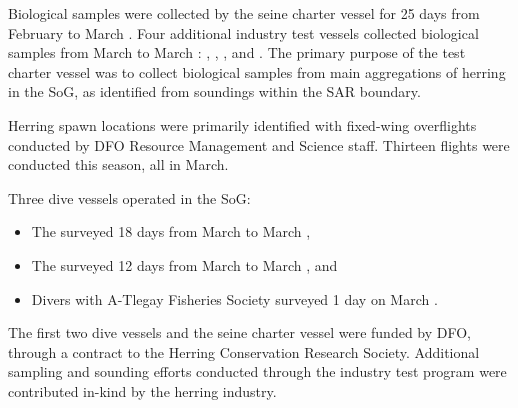 Biological samples were collected by the seine charter vessel
 for 25 days from February  to March .
Four additional industry test vessels collected biological samples
from March  to March : , ,
, and .
The primary purpose of the test charter vessel was to
collect biological samples from main aggregations of herring in the SoG,
as identified from soundings within the SAR boundary.

Herring spawn locations were primarily identified with
fixed-wing overflights conducted by DFO Resource Management and Science staff.
Thirteen flights were conducted this season, all in March.

Three dive vessels operated in the SoG:

\begin{itemize}

\item The  surveyed 18 days from March  to March ,

\item The  surveyed 12 days from March  to March , and

\item Divers with A-Tlegay Fisheries Society surveyed 1 day on March .

\end{itemize}

The first two dive vessels and the seine charter vessel 
were funded by DFO,
through a contract to the Herring Conservation Research Society.
Additional sampling and sounding efforts conducted through the
industry test program were contributed in-kind by the herring industry.
